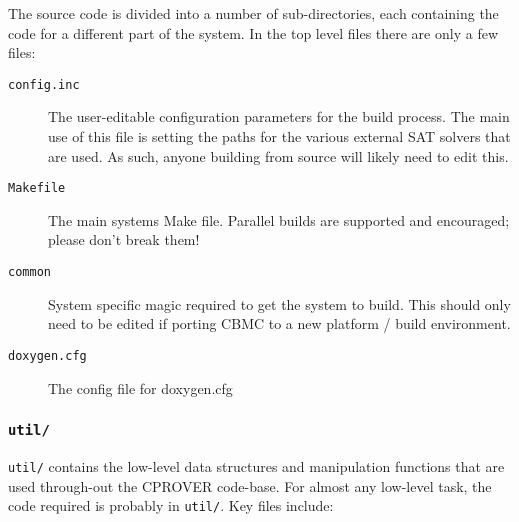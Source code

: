 \documentclass{article}
\newcommand{\dir}[1]{\texttt{#1}}
\newcommand{\file}[1]{\texttt{#1}}
\begin{document}
The source code is divided into a number of sub-directories, each
containing the code for a different part of the system.  In the top
level files there are only a few files:

\begin{description}
  \item[\file{config.inc}]{The user-editable configuration parameters
    for the build process.  The main use of this file is setting the
    paths for the various external SAT solvers that are used.  As
    such, anyone building from source will likely need to edit this.}
  \item[\file{Makefile}]{The main systems Make file.  Parallel builds
    are supported and encouraged; please don't break them!}
  \item[\file{common}]{System specific magic required to get the
    system to build.  This should only need to be edited if porting
    CBMC to a new platform / build environment.}
  \item[\file{doxygen.cfg}]{The config file for doxygen.cfg}
\end{description}



\subsubsection{\dir{util/}}
\label{section:util}

\dir{util/} contains the low-level data structures and manipulation
functions that are used through-out the CPROVER code-base.  For almost
any low-level task, the code required is probably in \dir{util/}.  Key
files include:
\end{document}
